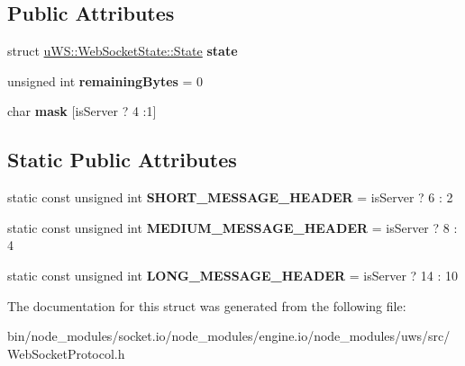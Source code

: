 \subsection*{Public Attributes}
\begin{DoxyCompactItemize}
\item 
\mbox{\label{structu_w_s_1_1_web_socket_state_aab582658bbe515e67e375fdee2e0d098}} 
struct \mbox{\hyperlink{structu_w_s_1_1_web_socket_state_1_1_state}{u\+W\+S\+::\+Web\+Socket\+State\+::\+State}} {\bfseries state}
\item 
\mbox{\label{structu_w_s_1_1_web_socket_state_a58b9608c83ac459aa7031fb299f78a55}} 
unsigned int {\bfseries remaining\+Bytes} = 0
\item 
\mbox{\label{structu_w_s_1_1_web_socket_state_a789b3283f24f39af8be7991c23d178cf}} 
char {\bfseries mask} \mbox{[}is\+Server ? 4 \+:1\mbox{]}
\end{DoxyCompactItemize}
\subsection*{Static Public Attributes}
\begin{DoxyCompactItemize}
\item 
\mbox{\label{structu_w_s_1_1_web_socket_state_a6d64ddfef5e73b07986cdee9e9d50aff}} 
static const unsigned int {\bfseries S\+H\+O\+R\+T\+\_\+\+M\+E\+S\+S\+A\+G\+E\+\_\+\+H\+E\+A\+D\+ER} = is\+Server ? 6 \+: 2
\item 
\mbox{\label{structu_w_s_1_1_web_socket_state_a8c30ea01c2f85d835ad68f1c031ec647}} 
static const unsigned int {\bfseries M\+E\+D\+I\+U\+M\+\_\+\+M\+E\+S\+S\+A\+G\+E\+\_\+\+H\+E\+A\+D\+ER} = is\+Server ? 8 \+: 4
\item 
\mbox{\label{structu_w_s_1_1_web_socket_state_a71fcc0f7a372635edbe91866ae0f10b4}} 
static const unsigned int {\bfseries L\+O\+N\+G\+\_\+\+M\+E\+S\+S\+A\+G\+E\+\_\+\+H\+E\+A\+D\+ER} = is\+Server ? 14 \+: 10
\end{DoxyCompactItemize}


The documentation for this struct was generated from the following file\+:\begin{DoxyCompactItemize}
\item 
bin/node\+\_\+modules/socket.\+io/node\+\_\+modules/engine.\+io/node\+\_\+modules/uws/src/Web\+Socket\+Protocol.\+h\end{DoxyCompactItemize}
